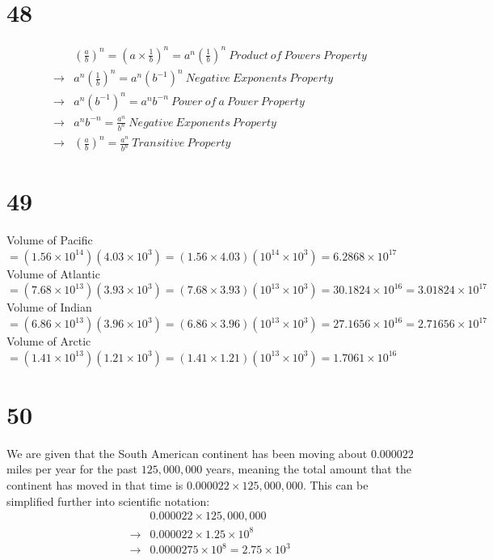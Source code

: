 \documentclass{article}
\theoremstyle{definition}
\begin{document}
\section*{48}
\[
\begin{array}{rl}
            & (\frac{a}{b})^n=(a\times\frac{1}{b})^n=a^n(\frac{1}{b})^n\  Product\ of\ Powers\ Property \\
\rightarrow & a^n(\frac{1}{b})^n=a^n(b^{-1})^n\  Negative\ Exponents\ Property \\
\rightarrow & a^n(b^{-1})^n=a^nb^{-n}\ Power\ of\ a\ Power\ Property \\
\rightarrow & a^nb^{-n}=\frac{a^n}{b^n}\ Negative\ Exponents\ Property \\
\rightarrow & (\frac{a}{b})^n=\frac{a^n}{b^n}\ Transitive\ Property

\end{array}
\]

\section*{49}
Volume of Pacific $=(1.56\times 10^{14})(4.03\times 10^3)=(1.56\times 4.03)(10^{14}\times 10^3)=6.2868\times 10^{17}$\newline
Volume of Atlantic $=(7.68\times 10^{13})(3.93\times 10^3)=(7.68\times 3.93)(10^{13}\times 10^3)=30.1824\times 10^{16}=3.01824\times 10^{17}$\newline
Volume of Indian $=(6.86\times 10^{13})(3.96\times 10^3)=(6.86\times 3.96)(10^{13}\times 10^3)=27.1656\times 10^{16}=2.71656\times 10^{17}$\newline
Volume of Arctic $=(1.41\times 10^{13})(1.21\times 10^3)=(1.41\times 1.21)(10^{13}\times 10^3)=1.7061\times 10^{16}$

\section*{50}
We are given that the South American continent has been moving about $0.000022$ miles per year for the past $125,000,000$ years, meaning 
the total amount that the continent has moved in that time is $0.000022\times 125,000,000$. This can be simplified further into scientific notation:\[
\begin{array}{rl}
            & 0.000022\times 125,000,000 \\
\rightarrow & 0.000022\times 1.25\times 10^8 \\
\rightarrow & 0.0000275\times 10^8=2.75\times 10^3
\end{array}
\]
\end{document}
